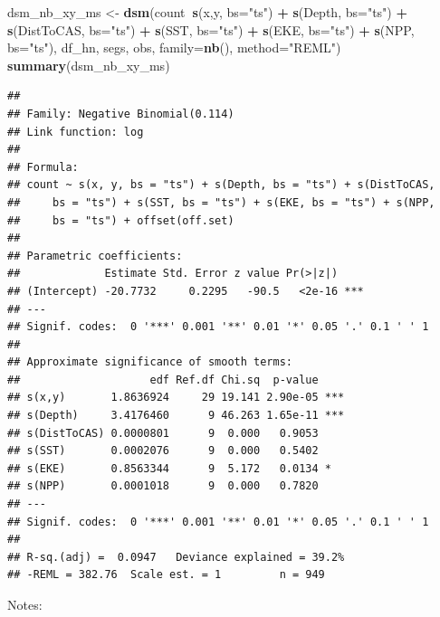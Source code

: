 \documentclass[]{book}
\newenvironment{Shaded}{\begin{snugshade}}{\end{snugshade}}
\newcommand{\KeywordTok}[1]{\textcolor[rgb]{0.13,0.29,0.53}{\textbf{#1}}}
\newcommand{\DataTypeTok}[1]{\textcolor[rgb]{0.13,0.29,0.53}{#1}}
\newcommand{\StringTok}[1]{\textcolor[rgb]{0.31,0.60,0.02}{#1}}
\newcommand{\OperatorTok}[1]{\textcolor[rgb]{0.81,0.36,0.00}{\textbf{#1}}}
\newcommand{\NormalTok}[1]{#1}
\theoremstyle{definition}
\theoremstyle{definition}
\theoremstyle{remark}
\begin{document}
\begin{Shaded}
\begin{Highlighting}[]
\NormalTok{dsm_nb_xy_ms <-}\StringTok{ }\KeywordTok{dsm}\NormalTok{(count}\OperatorTok{~}\KeywordTok{s}\NormalTok{(x,y, }\DataTypeTok{bs=}\StringTok{"ts"}\NormalTok{) }\OperatorTok{+}
\StringTok{                       }\KeywordTok{s}\NormalTok{(Depth, }\DataTypeTok{bs=}\StringTok{"ts"}\NormalTok{) }\OperatorTok{+}
\StringTok{                       }\KeywordTok{s}\NormalTok{(DistToCAS, }\DataTypeTok{bs=}\StringTok{"ts"}\NormalTok{) }\OperatorTok{+}
\StringTok{                       }\KeywordTok{s}\NormalTok{(SST, }\DataTypeTok{bs=}\StringTok{"ts"}\NormalTok{) }\OperatorTok{+}
\StringTok{                       }\KeywordTok{s}\NormalTok{(EKE, }\DataTypeTok{bs=}\StringTok{"ts"}\NormalTok{) }\OperatorTok{+}
\StringTok{                       }\KeywordTok{s}\NormalTok{(NPP, }\DataTypeTok{bs=}\StringTok{"ts"}\NormalTok{),}
\NormalTok{                 df_hn, segs, obs,}
                 \DataTypeTok{family=}\KeywordTok{nb}\NormalTok{(), }\DataTypeTok{method=}\StringTok{"REML"}\NormalTok{)}
\KeywordTok{summary}\NormalTok{(dsm_nb_xy_ms)}
\end{Highlighting}
\end{Shaded}

\begin{verbatim}
## 
## Family: Negative Binomial(0.114) 
## Link function: log 
## 
## Formula:
## count ~ s(x, y, bs = "ts") + s(Depth, bs = "ts") + s(DistToCAS, 
##     bs = "ts") + s(SST, bs = "ts") + s(EKE, bs = "ts") + s(NPP, 
##     bs = "ts") + offset(off.set)
## 
## Parametric coefficients:
##             Estimate Std. Error z value Pr(>|z|)    
## (Intercept) -20.7732     0.2295   -90.5   <2e-16 ***
## ---
## Signif. codes:  0 '***' 0.001 '**' 0.01 '*' 0.05 '.' 0.1 ' ' 1
## 
## Approximate significance of smooth terms:
##                    edf Ref.df Chi.sq  p-value    
## s(x,y)       1.8636924     29 19.141 2.90e-05 ***
## s(Depth)     3.4176460      9 46.263 1.65e-11 ***
## s(DistToCAS) 0.0000801      9  0.000   0.9053    
## s(SST)       0.0002076      9  0.000   0.5402    
## s(EKE)       0.8563344      9  5.172   0.0134 *  
## s(NPP)       0.0001018      9  0.000   0.7820    
## ---
## Signif. codes:  0 '***' 0.001 '**' 0.01 '*' 0.05 '.' 0.1 ' ' 1
## 
## R-sq.(adj) =  0.0947   Deviance explained = 39.2%
## -REML = 382.76  Scale est. = 1         n = 949
\end{verbatim}

Notes:
\end{document}

